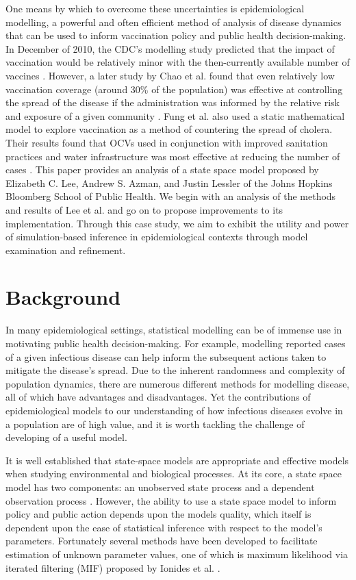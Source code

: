 \documentclass[12pt]{article}
\begin{document}
  One means by which to overcome these uncertainties is epidemiological modelling, a powerful and often efficient method of analysis of disease dynamics that can be used to inform vaccination policy and public health decision-making. In December of 2010, the CDC's modelling study predicted that the impact of vaccination would be relatively minor with the then-currently available number of vaccines \cite{date}. However, a later study by Chao et al. found that even relatively low vaccination coverage (around 30\% of the population) was effective at controlling the spread of the disease if the administration was informed by the relative risk and exposure of a given community \cite{chao}. Fung et al. also used a static mathematical model to explore vaccination as a method of countering the spread of cholera. Their results found that OCVs used in conjunction with improved sanitation practices and water infrastructure was most effective at reducing the number of cases \cite{fung}. This paper provides an analysis of a state space model proposed by Elizabeth C. Lee, Andrew S. Azman, and Justin Lessler of the Johns Hopkins Bloomberg School of Public Health. We begin with an analysis of the methods and results of Lee et al. and go on to propose improvements to its implementation. Through this case study, we aim to exhibit the utility and power of simulation-based inference in epidemiological contexts through model examination and refinement.

\section{Background}

  In many epidemiological settings, statistical modelling can be of immense use in motivating public health decision-making. For example, modelling reported cases of a given infectious disease can help inform the subsequent actions taken to mitigate the disease's spread. Due to the inherent randomness and complexity of population dynamics, there are numerous different methods for modelling disease, all of which have advantages and disadvantages. Yet the contributions of epidemiological models to our understanding of how infectious diseases evolve in a population are of high value, and it is worth tackling the challenge of developing of a useful model.
  
  It is well established that state-space models are appropriate and effective models when studying environmental and biological processes. At its core, a state space model has two components: an unobserved state process and a dependent observation process \cite{Ionides_infdynsys}. However, the ability to use a state space model to inform policy and public action depends upon the models quality, which itself is dependent upon the ease of statistical inference with respect to the model's parameters. Fortunately several methods have been developed to facilitate estimation of unknown parameter values, one of which is maximum likelihood via iterated filtering (MIF) proposed by Ionides et al. \cite{Ionides_if}.
  
\end{document}
